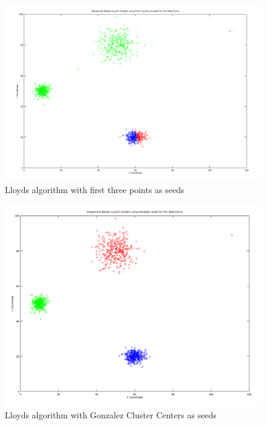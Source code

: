 \documentclass[11pt]{article}
\begin{document}
\begin{figure}[!htb]
\centering
\includegraphics[width=5in]{figures/2BLloydsS3.png}
\caption{Lloyds algorithm with first three points as seeds}
\label{2BLloydS3}
\end{figure}

\begin{figure}[!htb]
\centering
\includegraphics[width=5in]{figures/2BLloydsGSeed.png}
\caption{Lloyds algorithm with Gonzalez Cluster Centers as seeds}
\label{2BLloydsGSeed}
\end{figure}
\end{document}
